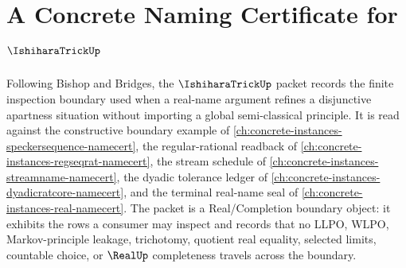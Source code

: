 \chapter{A Concrete Naming Certificate for $\IshiharaTrickUp$}
\label{ch:concrete-instances-ishihara-trick-namecert}

Following Bishop and Bridges, the $\IshiharaTrickUp$ packet records the finite inspection boundary used when a real-name argument refines a disjunctive apartness situation without importing a global semi-classical principle. It is read against the constructive boundary example of \autoref{ch:concrete-instances-speckersequence-namecert}, the regular-rational readback of \autoref{ch:concrete-instances-regseqrat-namecert}, the stream schedule of \autoref{ch:concrete-instances-streamname-namecert}, the dyadic tolerance ledger of \autoref{ch:concrete-instances-dyadicratcore-namecert}, and the terminal real-name seal of \autoref{ch:concrete-instances-real-namecert}. The packet is a Real/Completion boundary object: it exhibits the rows a consumer may inspect and records that no LLPO, WLPO, Markov-principle leakage, trichotomy, quotient real equality, selected limits, countable choice, or $\RealUp$ completeness travels across the boundary.

